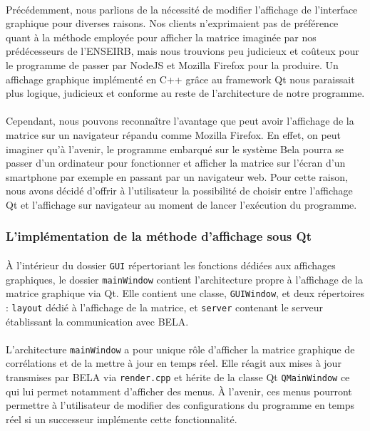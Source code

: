 \paragraph{}
Précédemment, nous parlions de la nécessité de modifier l'affichage de
l'interface graphique pour diverses raisons. Nos clients n'exprimaient
pas de préférence quant à la méthode employée pour afficher la matrice
imaginée par nos prédécesseurs de l'ENSEIRB, mais nous trouvions peu
judicieux et coûteux pour le programme de passer par NodeJS et Mozilla
Firefox pour la produire. Un affichage graphique implémenté en C++
grâce au framework Qt nous paraissait plus logique, judicieux et
conforme au reste de l'architecture de notre programme.
\paragraph{}
Cependant, nous pouvons reconnaître l'avantage que peut avoir
l'affichage de la matrice sur un navigateur répandu comme Mozilla
Firefox. En effet, on peut imaginer qu'à l'avenir, le programme
embarqué sur le système Bela pourra se passer d'un ordinateur pour
fonctionner et afficher la matrice sur l'écran d'un smartphone par
exemple en passant par un navigateur web. Pour cette raison, nous
avons décidé d'offrir à l'utilisateur la possibilité de choisir entre
l'affichage Qt et l'affichage sur navigateur au moment de lancer
l'exécution du programme.

\subsubsection{L'implémentation de la méthode d'affichage sous Qt}
\paragraph{}
\`{A} l'intérieur du dossier \verb!GUI! répertoriant les fonctions
dédiées aux affichages graphiques, le dossier \verb!mainWindow!
contient l'architecture propre à l'affichage de la matrice graphique
via Qt. Elle contient une classe, \verb!GUIWindow!, et deux
répertoires : \verb!layout! dédié à l'affichage de la matrice, et
\verb!server! contenant le serveur établissant la communication avec
BELA.
\paragraph{}
L'architecture \verb!mainWindow! a pour unique rôle d'afficher la
matrice graphique de corrélations et de la mettre à jour en temps
réel. Elle réagit aux mises à jour transmises par BELA via
\verb!render.cpp! et hérite de la classe Qt \verb!QMainWindow! ce qui
lui permet notamment d'afficher des menus. \`{A} l'avenir, ces menus
pourront permettre à l'utilisateur de modifier des configurations du
programme en temps réel si un successeur implémente cette
fonctionnalité.

